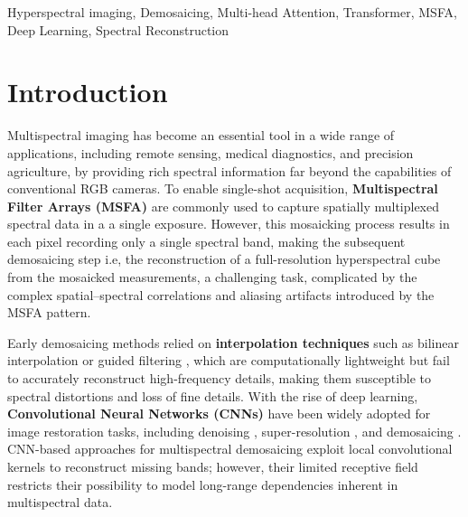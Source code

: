 \documentclass[conference]{IEEEtran}
\begin{document}
\begin{IEEEkeywords}
Hyperspectral imaging, Demosaicing, Multi-head Attention, Transformer, MSFA, Deep Learning, Spectral Reconstruction
\end{IEEEkeywords}

\section{Introduction}
Multispectral imaging has become an essential tool in a wide range of applications,
including remote sensing, medical diagnostics, and precision agriculture, by providing rich spectral 
information far beyond the capabilities of conventional RGB cameras.
To enable single-shot acquisition, \textbf{Multispectral Filter Arrays (MSFA)} are commonly used to
capture spatially multiplexed spectral data in a a single exposure.
However, this mosaicking process results in each pixel recording only a single spectral band, making
the subsequent demosaicing step i.e, the reconstruction of a full-resolution hyperspectral cube from
the mosaicked measurements, a challenging task, complicated by the complex spatial–spectral correlations 
and aliasing artifacts introduced by the MSFA pattern.

Early demosaicing methods relied on \textbf{interpolation techniques} such as bilinear 
interpolation or guided filtering \cite{article}, which are computationally lightweight but fail 
to accurately reconstruct high-frequency details, making them susceptible to spectral distortions 
and loss of fine details. With the rise of deep learning, 
\textbf{Convolutional Neural Networks (CNNs)} have been widely adopted for image restoration tasks, 
including denoising \cite{Zhang2017}, super-resolution \cite{Dong2016}, and demosaicing 
\cite{Monno2012}. CNN-based approaches for multispectral demosaicing exploit local convolutional 
kernels to reconstruct missing bands; however, their limited receptive field restricts their 
possibility to model long-range dependencies inherent in multispectral data. \\
\end{document}
